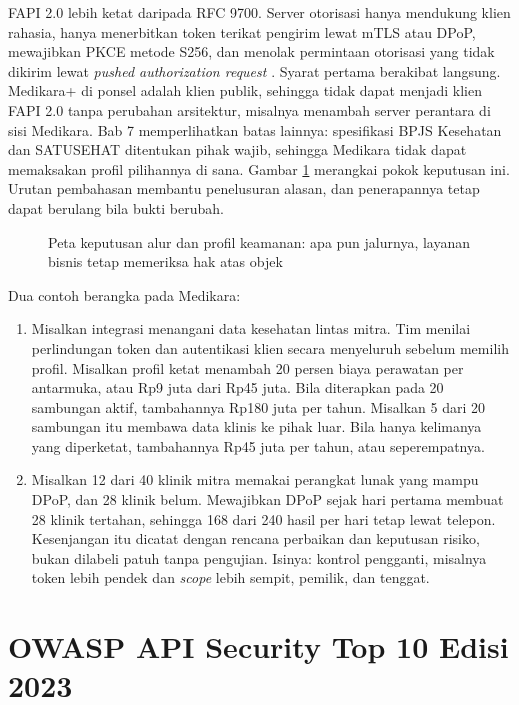 FAPI 2.0 lebih ketat daripada RFC 9700. Server otorisasi hanya mendukung klien rahasia, hanya menerbitkan token terikat
pengirim lewat mTLS atau DPoP, mewajibkan PKCE metode S256, dan menolak permintaan otorisasi yang tidak dikirim lewat
\textit{pushed authorization request} \cite{fapi2}. Syarat pertama berakibat langsung. Medikara+ di ponsel adalah klien
publik, sehingga tidak dapat menjadi klien FAPI 2.0 tanpa perubahan arsitektur, misalnya menambah server perantara di sisi
Medikara. Bab 7 memperlihatkan batas lainnya: spesifikasi BPJS Kesehatan dan SATUSEHAT ditentukan pihak wajib, sehingga
Medikara tidak dapat memaksakan profil pilihannya di sana. Gambar \ref{fig:ch06-keputusan} merangkai pokok keputusan ini.
Urutan pembahasan membantu penelusuran alasan, dan penerapannya tetap dapat berulang bila bukti berubah.

\begin{figure}[!htb]
  \centering
  
  \caption{Peta keputusan alur dan profil keamanan: apa pun jalurnya, layanan bisnis tetap memeriksa hak atas objek}
  \label{fig:ch06-keputusan}
\end{figure}

Dua contoh berangka pada Medikara:
\begin{enumerate}
  \item Misalkan integrasi menangani data kesehatan lintas mitra. Tim menilai perlindungan token dan autentikasi klien
        secara menyeluruh sebelum memilih profil. Misalkan profil ketat menambah 20 persen biaya perawatan per antarmuka,
        atau Rp9 juta dari Rp45 juta. Bila diterapkan pada 20 sambungan aktif, tambahannya Rp180 juta per tahun. Misalkan 5
        dari 20 sambungan itu membawa data klinis ke pihak luar. Bila hanya kelimanya yang diperketat, tambahannya Rp45 juta
        per tahun, atau seperempatnya.
  \item Misalkan 12 dari 40 klinik mitra memakai perangkat lunak yang mampu DPoP, dan 28 klinik belum. Mewajibkan DPoP sejak
        hari pertama membuat 28 klinik tertahan, sehingga 168 dari 240 hasil per hari tetap lewat telepon. Kesenjangan itu
        dicatat dengan rencana perbaikan dan keputusan risiko, bukan dilabeli patuh tanpa pengujian. Isinya: kontrol
        pengganti, misalnya token lebih pendek dan \textit{scope} lebih sempit, pemilik, dan tenggat.
\end{enumerate}

\section{OWASP API Security Top 10 Edisi 2023}

